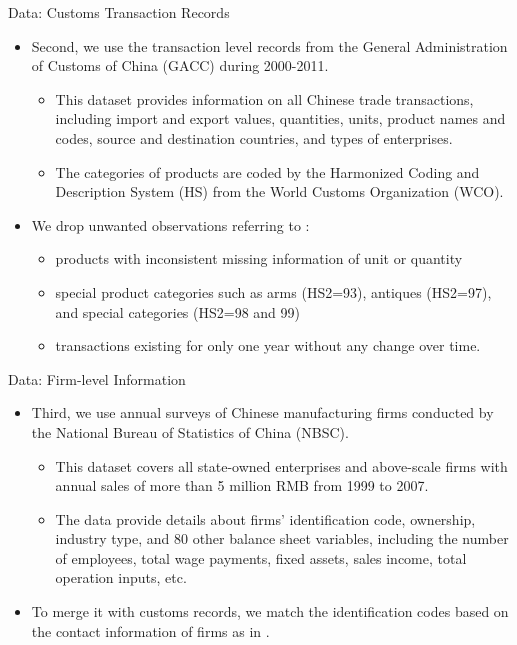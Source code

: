 \documentclass[10pt]{beamer}
\begin{document}
\begin{frame}{Data: Customs Transaction Records}
	\begin{itemize}
		\item Second, we use the transaction level records from the General Administration of Customs of China (GACC) during 2000-2011.
		\begin{itemize}
			\item This dataset provides information on
			all Chinese trade transactions, including import and export values, quantities, units, product names and codes, source and destination countries, and types of enterprises.
			\item The categories of products are coded by the Harmonized Coding and Description System (HS) from the World Customs Organization (WCO).
		\end{itemize}
		\item We drop unwanted observations referring to \cite{lmx2015}:
		\begin{itemize}
			\item products with inconsistent missing information of unit or quantity
			\item special product categories such as arms (HS2=93), antiques (HS2=97), and special categories (HS2=98 and 99)
			\item transactions existing for only one year without any change over time.
		\end{itemize}
	\end{itemize}
\end{frame}

\begin{frame}{Data: Firm-level Information}
	\begin{itemize}
		\item Third, we use annual surveys of Chinese manufacturing firms conducted by the National Bureau of Statistics of China (NBSC).
		\begin{itemize}
			\item This dataset covers all state-owned enterprises and above-scale firms with annual sales of more than 5 million RMB from 1999 to 2007.
			\item The data provide details about firms’ identification code, ownership, industry type, and 80 other balance sheet variables, including the number of employees, total wage payments, fixed assets, sales income, total operation inputs, etc.
		\end{itemize}
		\item To merge it with customs records, we match the identification codes based on the contact information of firms as in \cite{fan-li-yeaple2015}.
	\end{itemize}
\end{frame}
\end{document}
